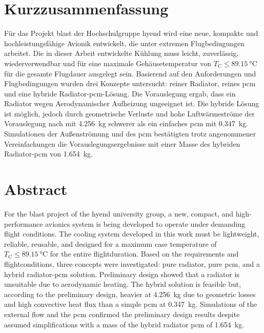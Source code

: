 \chapter*{Kurzzusammenfassung} %
\label{chap:Kurzzusammenfassung}


Für das Projekt \ac{blast} der Hochschulgruppe \ac{hyend} wird eine neue, kompakte und hochleistungsfähige Avionik entwickelt,
die unter extremen Flugbedingungen arbeitet. Die in dieser Arbeit entwickelte Kühlung muss leicht, zuverlässig, wiederverwendbar und für eine
maximale Gehäusetemperatur von $T_\mathrm{C} \leq \SI{89.15}{\celsius}$ für die gesamte Flugdauer ausgelegt sein.
Basierend auf den Anforderungen und Flugbedingungen
wurden drei Konzepte untersucht: reiner Radiator, reines \ac{pcm} und eine hybride Radiator-\ac{pcm}-Lösung. Die Vorauslegung
ergab, dass ein Radiator wegen Aerodynamischer Aufheizung ungeeignet ist. Die hybride Lösung ist möglich, jedoch durch geometrische
Verluste und hohe Luftwärmeströme der Vorauslegung nach mit \SI{4.256}{\kilogram} schwerer als ein einfaches \ac{pcm}
mit \SI{0.347}{\kilogram}. Simulationen der Außenströmung und des \ac{pcm}
bestätigten trotz angenommener Vereinfachungen die Vorauslegungsergebnisse mit einer Masse des hybriden Radiator-\ac{pcm} von \SI{1.654}{\kilogram}.

\chapter*{Abstract} %
\label{chap:Abstract}
For the \ac{blast} project of the \ac{hyend} university group, a new, compact, and high-performance avionics system is being developed to
operate under demanding flight conditions. The cooling system developed in this work must be lightweight, reliable, reusable, and designed for a maximum
case temperature of $T_\mathrm{C} \leq \SI{89.15}{\celsius}$ for the entire flightduration.
Based on the requirements and flightconditions, three concepts were investigated: pure radiator, pure \ac{pcm}, and a hybrid radiator-\ac{pcm}
solution. Preliminary design showed that a radiator is unsuitable due to aerodynamic heating. The hybrid solution is feasible but, according to
the preliminary design, heavier at \SI{4.256}{\kilogram} due to geometric losses and high convective heat flux than a simple \ac{pcm} at
\SI{0.347}{\kilogram}. Simulations of the external flow and the \ac{pcm} confirmed the preliminary design results despite assumed
simplifications with a mass of the hybrid radiator \ac{pcm} of \SI{1.654}{\kilogram}.